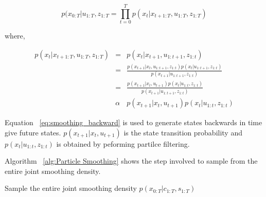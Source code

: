 \documentclass[12pt,draft]{dalcsthesis}
\begin{document}
\begin{equation}
p(x_{0:T}|u_{1:T},z_{1:T}=\prod_{t=0}^{T}p(x_{t}|x_{t+1:T},u_{1:T},z_{1:T})
\end{equation}

where,

\begin{eqnarray}
p(x_{t}|x_{t+1:T},u_{1:T},z_{1:T}) & = & p(x_{t}|x_{t+1},u_{1:t+1},z_{1:t})\\
 & = & \frac{p(x_{t+1}|x_{t},u_{1:t+1},z_{1:t})p(x_{t}|u_{1:t+1},z_{1:t})}{p(x_{t+1}|u_{1:t+1},z_{1:t})}\\
 & = & \frac{p(x_{t+1}|x_{t},u_{t+1})p(x_{t}|u_{1:t},z_{1:t})}{p(x_{t+1}|u_{1:t+1},z_{1:t})}\\
\label{eq:smoothing_backward} & \alpha & p(x_{t+1}|x_{t},u_{t+1})p(x_{t}|u_{1:t},z_{1:t})
\end{eqnarray}

Equation ~\ref{eq:smoothing_backward} is used to generate states backwards in time give future states. $p(x_{t+1}|x_{t},u_{t+1})$ is the state transition probability and $p(x_{t}|u_{1:t},z_{1:t})$ is obtained by peforming partilce filtering. 

Algorithm ~\ref{alg:Particle Smoothing} shows the step involved to sample from the entire joint smoothing density.

\begin{algorithm}[H]
 \SetAlgoLined
  	\label{alg:Particle Smoothing}
	\caption{Sample the entire joint smoothing density $p(x_{0:T}|c_{1:T},s_{1:T})$}
	
\end{algorithm}
\end{document}
